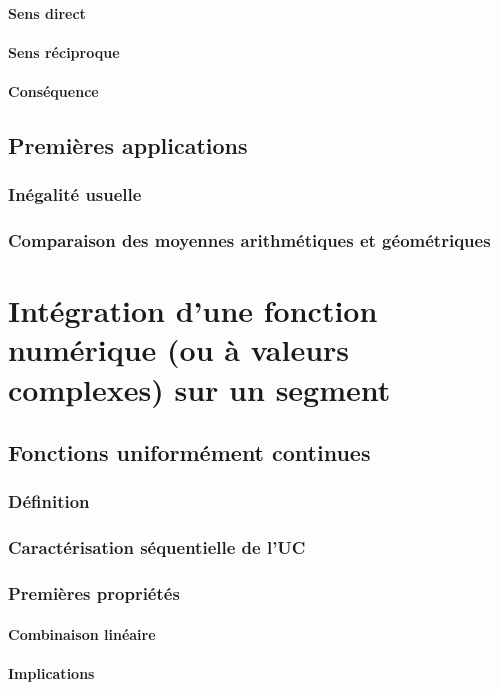 \documentclass[12pt,a4paper,french]{book}
\begin{document}
			\subsubsection{Sens direct}
			\subsubsection{Sens réciproque}
			\subsubsection{Conséquence}
	\section{Premières applications}
		\subsection{Inégalité usuelle}
		\subsection{Comparaison des moyennes arithmétiques et géométriques}
		
\chapter{Intégration d'une fonction numérique (ou à valeurs complexes) sur un segment}
	\section{Fonctions uniformément continues}
		\subsection{Définition}
		\subsection{Caractérisation séquentielle de l'UC}
		\subsection{Premières propriétés}
			\subsubsection{Combinaison linéaire}
			\subsubsection{Implications}
\end{document}
